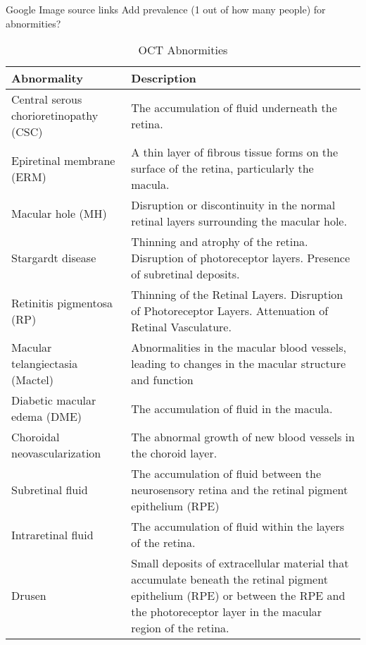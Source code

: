 \documentclass{article}
\begin{document}
		Google Image source links
		Add prevalence (1 out of how many people) for abnormities?
		
		{
			\fontsize{9}{12}\selectfont
			{
				\begin{longtable}{lp{3.8in}}
					\caption{OCT Abnormities}
					\label{tb:oct-abnormites}\\
					\toprule
					Abnormality&Description\\
					\toprule
					
					\multicolumn{1}{l}{Central serous chorioretinopathy (CSC)}
					& \multicolumn{1}{l}{The accumulation of fluid underneath the retina.}\\
					
					\multicolumn{1}{l}{Epiretinal membrane (ERM)}
					& A thin layer of fibrous tissue forms on the surface of the retina, particularly the macula.\\
					
					\multicolumn{1}{l}{Macular hole (MH)}
					& Disruption or discontinuity in the normal retinal layers surrounding the macular hole.\\
					
					\multicolumn{1}{l}{Stargardt disease}
					& Thinning and atrophy of the retina. Disruption of photoreceptor layers. Presence of subretinal deposits.\\
					
					\multicolumn{1}{l}{Retinitis pigmentosa (RP)}
					& Thinning of the Retinal Layers. Disruption of Photoreceptor Layers. Attenuation of Retinal Vasculature.\\
					
					\multicolumn{1}{l}{Macular telangiectasia (Mactel)}
					& Abnormalities in the macular blood vessels, leading to changes in the macular structure and function\\
					
					\multicolumn{1}{l}{Diabetic macular edema (DME)}
					& The accumulation of fluid in the macula. \\
					
					\multicolumn{1}{l}{Choroidal neovascularization}
					& The abnormal growth of new blood vessels in the choroid layer.\\
					
					\multicolumn{1}{l}{Subretinal fluid}
					&  The accumulation of fluid between the neurosensory retina and the retinal pigment epithelium (RPE)\\
					
					\multicolumn{1}{l}{Intraretinal fluid}
					& The accumulation of fluid within the layers of the retina.\\
					
					\multicolumn{1}{l}{Drusen}
					& Small deposits of extracellular material that accumulate beneath the retinal pigment epithelium (RPE) or between the RPE and the photoreceptor layer in the macular region of the retina.\\
					
					\bottomrule
				\end{longtable}
			}
		}
		
\end{document}
